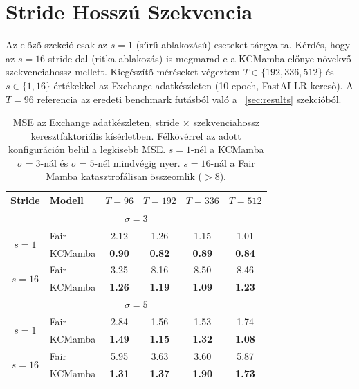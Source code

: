 \section{Stride \texttimes{} Hosszú Szekvencia}
\label{sec:stride_longseq}

Az előző szekció csak az $s{=}1$ (sűrű ablakozású) eseteket tárgyalta.
Kérdés, hogy az $s{=}16$ stride-dal (ritka ablakozás) is megmarad-e a KCMamba
előnye növekvő szekvenciahossz mellett. Kiegészítő méréseket végeztem
$T \in \{192, 336, 512\}$ és $s \in \{1, 16\}$ értékekkel az Exchange
adatkészleten (10 epoch, FastAI LR-kereső). A $T{=}96$ referencia az eredeti
benchmark futásból való a ~\ref{sec:results} szekcióból.

\begin{table}[H]
    \centering
    \small
    \begin{tabular}{|c|l|cccc|}
        \hline
        \textbf{Stride} & \textbf{Modell} &
        $T{=}96$ & $T{=}192$ & $T{=}336$ & $T{=}512$ \\
        \hline\hline
        \multicolumn{6}{|c|}{$\sigma{=}3$} \\
        \hline
        \multirow{2}{*}{$s=1$}
            & Fair    & 2.12 & 1.26 & 1.15 & 1.01 \\
            & KCMamba & \textbf{0.90} & \textbf{0.82} & \textbf{0.89} & \textbf{0.84} \\
        \hline
        \multirow{2}{*}{$s=16$}
            & Fair    & 3.25 & 8.16 & 8.50 & 8.46 \\
            & KCMamba & \textbf{1.26} & \textbf{1.19} & \textbf{1.09} & \textbf{1.23} \\
        \hline\hline
        \multicolumn{6}{|c|}{$\sigma{=}5$} \\
        \hline
        \multirow{2}{*}{$s=1$}
            & Fair    & 2.84 & 1.56 & 1.53 & 1.74 \\
            & KCMamba & \textbf{1.49} & \textbf{1.15} & \textbf{1.32} & \textbf{1.08} \\
        \hline
        \multirow{2}{*}{$s=16$}
            & Fair    & 5.95 & 3.63 & 3.60 & 5.87 \\
            & KCMamba & \textbf{1.31} & \textbf{1.37} & \textbf{1.90} & \textbf{1.73} \\
        \hline
    \end{tabular}
    \caption{MSE az Exchange adatkészleten, stride $\times$ szekvenciahossz
             keresztfaktoriális kísérletben.
             Félkövérrel az adott konfiguráción belül a legkisebb MSE.
             $s{=}1$-nél a KCMamba $\sigma{=}3$-nál és $\sigma{=}5$-nél mindvégig nyer.
             $s{=}16$-nál a Fair Mamba katasztrofálisan összeomlik ($>8$).}
    \label{tab:stride_longseq}
\end{table}

